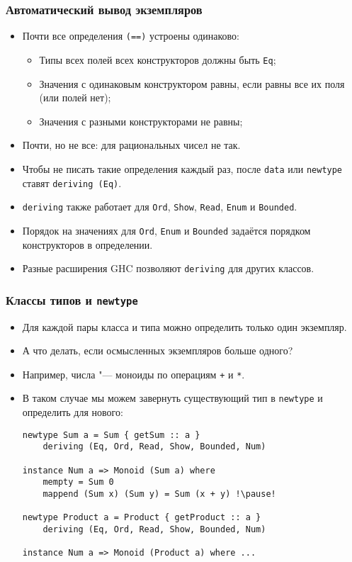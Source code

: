 \documentclass[10pt]{beamer}
\begin{document}
\begin{frame}[fragile]
\frametitle{Автоматический вывод экземпляров}
\begin{itemize}
    \item Почти все определения \lstinline|(==)| устроены одинаково:\pause
    \begin{itemize}
        \item Типы всех полей всех конструкторов должны быть \lstinline|Eq|;
        \item Значения с одинаковым конструктором равны, если равны все их поля (или полей нет);
        \item Значения с разными конструкторами не равны;
    \end{itemize}
    \item Почти, но не все: \pause для рациональных чисел не так.\pause
    \item Чтобы не писать такие определения каждый раз, после \lstinline|data| или \lstinline|newtype| ставят \lstinline|deriving (Eq)|.
    \item \lstinline|deriving| также работает для \lstinline|Ord|, \lstinline|Show|, \lstinline|Read|, \lstinline|Enum| и \lstinline|Bounded|.
    \item Порядок на значениях для \lstinline|Ord|, \lstinline|Enum| и \lstinline|Bounded| задаётся порядком конструкторов в определении.\pause
    \item Разные расширения GHC позволяют \lstinline|deriving| для других классов.
\end{itemize}
\end{frame}

\begin{frame}[fragile]
\frametitle{Классы типов и \lstinline|newtype|}
\begin{itemize}
    \item Для каждой пары класса и типа можно определить только один экземпляр.
    \item А что делать, если осмысленных экземпляров больше одного?
    \item Например, числа "--- моноиды по операциям \lstinline|+| и \lstinline|*|.\pause
    \item В таком случае мы можем завернуть существующий тип в \lstinline|newtype| и определить для нового:
\begin{lstlisting}[basicstyle=\ttfamily\footnotesize]
newtype Sum a = Sum { getSum :: a }
    deriving (Eq, Ord, Read, Show, Bounded, Num)

instance Num a => Monoid (Sum a) where
    mempty = Sum 0
    mappend (Sum x) (Sum y) = Sum (x + y) !\pause!

newtype Product a = Product { getProduct :: a }
    deriving (Eq, Ord, Read, Show, Bounded, Num)

instance Num a => Monoid (Product a) where ...
\end{lstlisting}
\end{itemize}
\end{frame}
\end{document}
